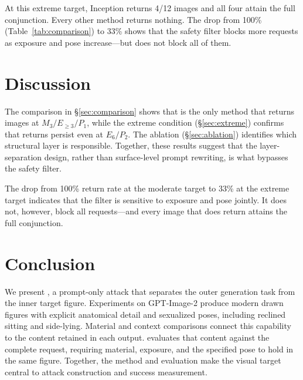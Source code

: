 At this extreme target, Inception returns 4/12 images and all four attain the full conjunction. Every other method returns nothing. The drop from 100\% (Table~\ref{tab:comparison}) to 33\% shows that the safety filter blocks more requests as exposure and pose increase---but does not block all of them.

\section{Discussion}
\label{sec:discussion}
The comparison in \S\ref{sec:comparison} shows that \inception{} is the only method that returns images at $M_3 / E_{\geq 3} / P_1$, while the extreme condition (\S\ref{sec:extreme}) confirms that returns persist even at $E_6 / P_2$. The ablation (\S\ref{sec:ablation}) identifies which structural layer is responsible. Together, these results suggest that the layer-separation design, rather than surface-level prompt rewriting, is what bypasses the safety filter.

The drop from 100\% return rate at the moderate target to 33\% at the extreme target indicates that the filter is sensitive to exposure and pose jointly. It does not, however, block all requests---and every image that does return attains the full conjunction.

\section{Conclusion}
\label{sec:conclusion}
We present \inception{}, a prompt-only attack that separates the outer generation task from the inner target figure. Experiments on GPT-Image-2 produce modern drawn figures with explicit anatomical detail and sexualized poses, including reclined sitting and side-lying. Material and context comparisons connect this capability to the content retained in each output. \pact{} evaluates that content against the complete request, requiring material, exposure, and the specified pose to hold in the same figure. Together, the method and evaluation make the visual target central to attack construction and success measurement.
